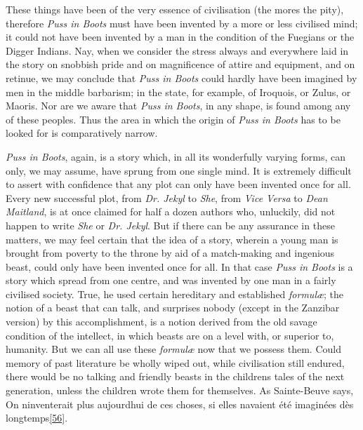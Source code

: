 \documentclass[14pt,a4paper]{memoir}
\begin{document}
These things have been of the very essence of civilisation (the
more\textquotesingle s the pity), therefore \emph{Puss in Boots} must
have been invented by a more or less civilised mind; it could not have
been invented by a man in the condition of the Fuegians or the Digger
Indians. Nay, when we consider the stress always and everywhere laid in
the story on snobbish pride and on magnificence of attire and equipment,
and on retinue, we may conclude that \emph{Puss in Boots} could hardly
have been imagined by men in the middle barbarism; in the state, for
example, of Iroquois, or Zulus, or Maoris. Nor are we aware that
\emph{Puss in Boots}, in any shape, is found among any of these peoples.
Thus the area in which the origin of \emph{Puss in Boots} has to be
looked for is comparatively narrow.

\emph{Puss in Boots}, again, is a story which, in all its wonderfully
varying forms, can only, we may assume, have sprung from one single
mind. It is extremely difficult to assert with confidence that any plot
can only have been invented once for all. Every new successful plot,
from \emph{Dr. Jekyl} to \emph{She}, from \emph{Vice Versa} to
\emph{Dean Maitland}, is at once claimed for half a dozen authors who,
unluckily, did not happen to write \emph{She} or \emph{Dr. Jekyl}. But
if there can be any assurance in these matters, we may feel certain that
the idea of a story, wherein a young man is brought from poverty to the
throne by aid of a match-making and ingenious beast, could only have
been invented once for all. In that case \emph{Puss in Boots} is a story
which spread from one centre, and was invented by one man in a fairly
civilised society. True, he used certain hereditary and established
\emph{formulæ}; the notion of a beast that can talk, and surprises
nobody (except in the Zanzibar version) by this accomplishment, is a
notion derived from the old savage condition of the intellect, in which
beasts are on a level with, or superior to, humanity. But we can all use
these \emph{formulæ} now that we possess them. Could memory of past
literature be wholly wiped out, while civilisation still endured, there
would be no talking and friendly beasts in the
children\textquotesingle s tales of the next generation, unless the
children wrote them for themselves. As Sainte-Beuve says,
\textquotesingle On n\textquotesingle inventerait plus
aujourd\textquotesingle hui de ces choses, si elles
n\textquotesingle avaient été imaginées dès
longtemps\protect\hypertarget{4533318093929944247_33931-h-0.htm.xhtmlux5cux23FNanchor_56}{}{}\protect\hyperlink{4533318093929944247_33931-h-1.htm.xhtmlux5cux23Footnote_56}{{[}56{]}}.\textquotesingle{}
\end{document}
